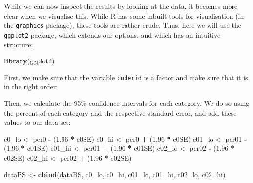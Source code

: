 \documentclass[
]{book}
\newenvironment{Shaded}{\begin{snugshade}}{\end{snugshade}}
\newcommand{\DecValTok}[1]{\textcolor[rgb]{0.00,0.00,0.81}{#1}}
\newcommand{\FloatTok}[1]{\textcolor[rgb]{0.00,0.00,0.81}{#1}}
\newcommand{\FunctionTok}[1]{\textcolor[rgb]{0.13,0.29,0.53}{\textbf{#1}}}
\newcommand{\NormalTok}[1]{#1}
\newcommand{\OtherTok}[1]{\textcolor[rgb]{0.56,0.35,0.01}{#1}}
\newcommand{\SpecialCharTok}[1]{\textcolor[rgb]{0.81,0.36,0.00}{\textbf{#1}}}
\begin{document}
While we can now inspect the results by looking at the data, it becomes more clear when we visualise this. While R has some inbuilt tools for visualisation (in the \texttt{graphics} package), these tools are rather crude. Thus, here we will use the \texttt{ggplot2} package, which extends our options, and which has an intuitive structure:

\begin{Shaded}
\begin{Highlighting}[]
\FunctionTok{library}\NormalTok{(ggplot2)}
\end{Highlighting}
\end{Shaded}

First, we make sure that the variable \texttt{coderid} is a factor and make sure that it is in the right order:

\begin{Shaded}
\end{Shaded}

Then, we calculate the 95\% confidence intervals for each category. We do so using the percent of each category and the respective standard error, and add these values to our data-set:

\begin{Shaded}
\begin{Highlighting}[]
\NormalTok{c0\_lo }\OtherTok{\textless{}{-}}\NormalTok{ per0 }\SpecialCharTok{{-}}\NormalTok{ (}\FloatTok{1.96} \SpecialCharTok{*}\NormalTok{ c0SE)}
\NormalTok{c0\_hi }\OtherTok{\textless{}{-}}\NormalTok{ per0 }\SpecialCharTok{+}\NormalTok{ (}\FloatTok{1.96} \SpecialCharTok{*}\NormalTok{ c0SE)}
\NormalTok{c01\_lo }\OtherTok{\textless{}{-}}\NormalTok{ per01 }\SpecialCharTok{{-}}\NormalTok{ (}\FloatTok{1.96} \SpecialCharTok{*}\NormalTok{ c01SE)}
\NormalTok{c01\_hi }\OtherTok{\textless{}{-}}\NormalTok{ per01 }\SpecialCharTok{+}\NormalTok{ (}\FloatTok{1.96} \SpecialCharTok{*}\NormalTok{ c01SE)}
\NormalTok{c02\_lo }\OtherTok{\textless{}{-}}\NormalTok{ per02 }\SpecialCharTok{{-}}\NormalTok{ (}\FloatTok{1.96} \SpecialCharTok{*}\NormalTok{ c02SE)}
\NormalTok{c02\_hi }\OtherTok{\textless{}{-}}\NormalTok{ per02 }\SpecialCharTok{+}\NormalTok{ (}\FloatTok{1.96} \SpecialCharTok{*}\NormalTok{ c02SE)}

\NormalTok{dataBS }\OtherTok{\textless{}{-}} \FunctionTok{cbind}\NormalTok{(dataBS, c0\_lo, c0\_hi, c01\_lo, c01\_hi, c02\_lo, c02\_hi)}
\end{Highlighting}
\end{Shaded}
\end{document}
